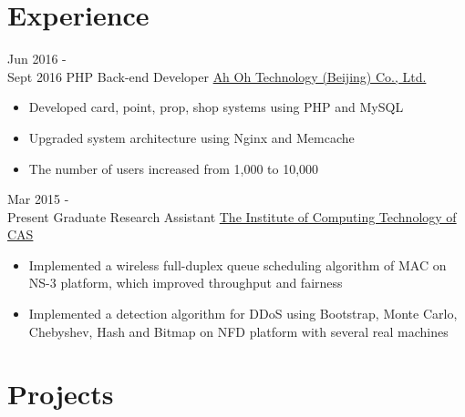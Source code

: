 \documentclass[letterpaper]{twentysecondcv} %
\begin{document}
\makeprofile %



\section{Experience}

\begin{twenty} %
	\twentyitem
    	{Jun 2016 - \\Sept 2016}
        {PHP Back-end Developer}
        {\href{http://www.runorout.cn/}{Ah Oh Technology (Beijing) Co., Ltd.}}
        {}
        {
        {\begin{itemize}
        \item Developed card, point, prop, shop systems using PHP and MySQL
        \item Upgraded system architecture using Nginx and Memcache
        \item The number of users increased from 1,000 to 10,000
    \end{itemize}}
        }
    
    \twentyitem
	    {Mar 2015 - \\Present}
	    {Graduate Research Assistant}
	    {\href{http://english.ict.cas.cn/}{ The Institute of Computing Technology of CAS}}
	    {}
	    {
    	{\begin{itemize}
    			\item Implemented a wireless full-duplex queue scheduling algorithm of MAC on NS-3 platform, which improved throughput and fairness
    			\item Implemented a detection algorithm for DDoS using Bootstrap, Monte Carlo, Chebyshev, Hash and Bitmap on NFD platform with several real machines
    	\end{itemize}}
    }
        
\end{twenty}


\section{Projects}
\end{document}
